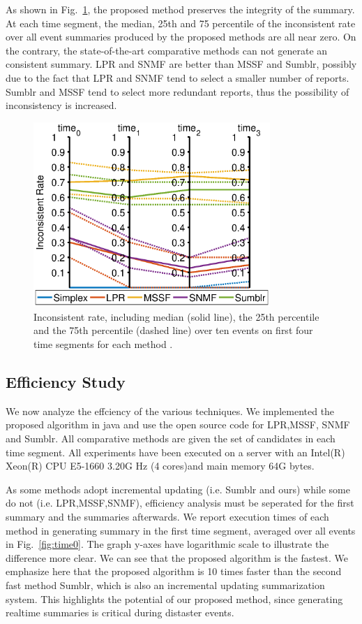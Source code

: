\documentclass[envcountsame]{llncs}
\begin{document}
As shown in Fig.~\ref{fig:conflictRatio}, the proposed method preserves the integrity of the summary. At each time segment, the median, 25th and 75 percentile of the inconsistent rate over all event summaries produced by the proposed methods are all near zero. On the contrary, the state-of-the-art comparative methods can not generate an consistent summary. LPR and SNMF are better than MSSF and Sumblr, possibly due to the fact that LPR and SNMF tend to select a smaller number of reports. Sumblr and MSSF tend to select more redundant reports, thus the possibility of inconsistency is increased.
\begin{figure}\label{fig:conflictRatio}
    \centering
    \includegraphics[width=0.8\textwidth]{conflictRatio.eps}
    \caption{Inconsistent rate, including median (solid line), the  25th percentile and the 75th percentile (dashed line) over ten events on first four time segments for each method .}
\end{figure}

\subsection{Efficiency Study}

We now analyze the effciency of the various techniques. We implemented the proposed algorithm in java and use the open source code for LPR,MSSF, SNMF and Sumblr. All comparative methods are given the set of candidates in each time segment. All experiments have been executed on a server with an Intel(R) Xeon(R) CPU E5-1660 3.20G Hz (4 cores)and main memory 64G bytes.


As some methods adopt incremental updating (i.e. Sumblr and ours) while some do not (i.e. LPR,MSSF,SNMF), efficiency analysis must be seperated for the first summary and the summaries afterwards. We report execution times of each method in generating summary in the first time segment, averaged over all events in Fig.~\ref{fig:time0}. The graph y-axes have logarithmic scale to illustrate the difference more clear. We can see that the proposed algorithm is the fastest. We emphasize here that the proposed algorithm is 10 times faster than the second fast method Sumblr, which is also an incremental updating summarization system.  This highlights the potential of our proposed method, since generating realtime summaries is critical during distaster events. 
\end{document}
